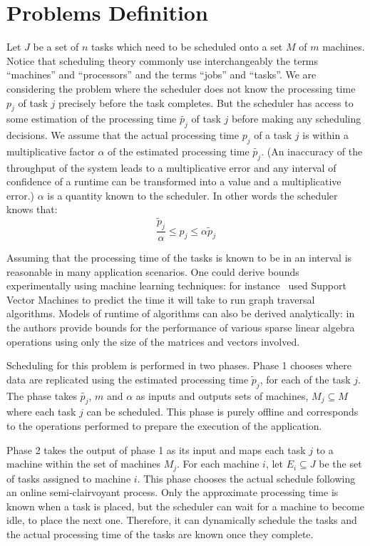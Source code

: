 \documentclass[twocolumn]{svjour3}
\begin{document}
\section{Problems Definition}\label{sec2}
Let $J$ be a set of $n$ tasks which need to be scheduled onto a set
$M$ of $m$ machines. Notice that scheduling theory commonly use
interchangeably the terms ``machines'' and ``processors'' and the
terms ``jobs'' and ``tasks''. We are considering the problem where the
scheduler does not know the processing time $p_j$ of task $j$
precisely before the task completes.  But the scheduler has access to
some estimation of the processing time $\tilde{p_j}$ of task $j$
before making any scheduling decisions. We assume that the actual
processing time $p_j$ of a task $j$ is within a multiplicative factor
$\alpha$ of the estimated processing time $\tilde{p_j}$. (An
inaccuracy of the throughput of the system leads to a multiplicative
error and any interval of confidence of a runtime can be transformed
into a value and a multiplicative error.) $\alpha$ is a quantity known
to the scheduler. In other words the scheduler knows that:
 \begin{equation}\label{eq1}
\frac{\tilde{p}_{j}}{\alpha}\leq p_{j}\leq \alpha \tilde{p}_{j}
\end{equation}

Assuming that the processing time of the tasks is known to be in an
interval is reasonable in many application scenarios. One could derive
bounds experimentally using machine learning techniques: for
instance~\cite{You14-ICPP} used Support Vector Machines to predict the
time it will take to run graph traversal algorithms. Models of runtime
of algorithms can also be derived analytically:
in~\cite{Erlebacher14-ICS} the authors provide bounds for the
performance of various sparse linear algebra operations using only the
size of the matrices and vectors involved.

Scheduling for this problem is performed in two phases. Phase 1
chooses where data are replicated using the estimated processing time
$\tilde p_j $, for each of the task $j$. The phase takes
$\tilde{p_j}$, $m$ and $\alpha$ as inputs and outputs sets of
machines, $M_j \subseteq M $ where each task $j$ can be
scheduled. This phase is purely offline and corresponds to the
operations performed to prepare the execution of the application.

Phase 2 takes the output of phase 1 as its input and maps each task
$j$ to a machine within the set of machines $M_j$. For each machine
$i$, let $E_i \subseteq J$ be the set of tasks assigned to machine
$i$. This phase chooses the actual schedule following an online
semi-clairvoyant process. Only the approximate processing time is
known when a task is placed, but the scheduler can wait for a machine
to become idle, to place the next one. Therefore, it can dynamically
schedule the tasks and the actual processing time of the tasks are
known once they complete.
\end{document}
